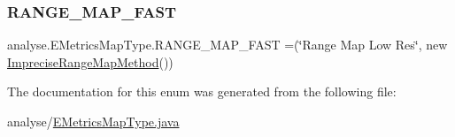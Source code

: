 \mbox{\label{enumanalyse_1_1_e_metrics_map_type_af3d5a25a4a59a36b66a8f4dd637451ae}} 
\subsubsection{\texorpdfstring{R\+A\+N\+G\+E\+\_\+\+M\+A\+P\+\_\+\+F\+A\+ST}{RANGE\_MAP\_FAST}}
{\footnotesize\ttfamily analyse.\+E\+Metrics\+Map\+Type.\+R\+A\+N\+G\+E\+\_\+\+M\+A\+P\+\_\+\+F\+A\+ST =(\char`\"{}Range Map Low Res\char`\"{}, new \mbox{\hyperlink{classanalyse_1_1map_methods_1_1_imprecise_range_map_method}{Imprecise\+Range\+Map\+Method}}())}



The documentation for this enum was generated from the following file\+:\begin{DoxyCompactItemize}
\item 
analyse/\mbox{\hyperlink{_e_metrics_map_type_8java}{E\+Metrics\+Map\+Type.\+java}}\end{DoxyCompactItemize}
